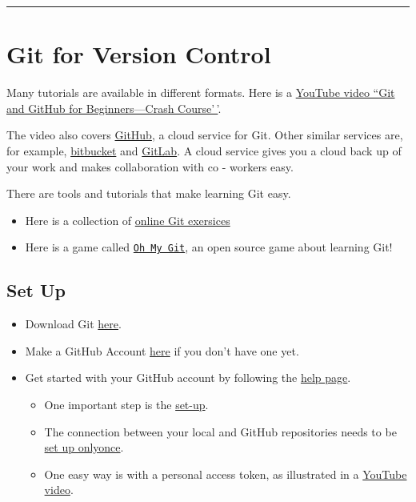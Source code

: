 \documentclass[
]{book}
\theoremstyle{definition}
\theoremstyle{definition}
\theoremstyle{definition}
\theoremstyle{definition}
\theoremstyle{remark}
\begin{document}
\begin{center}\rule{0.5\linewidth}{0.5pt}\end{center}

\section{Git for Version Control}\label{git-for-version-control}

Many tutorials are available in different formats. Here is a \href{https://www.youtube.com/watch?v=USjZcfj8yxE}{YouTube video
``Git and GitHub for Beginners---Crash
Course'\,'}.

The video also covers \href{https://github.com}{GitHub}, a cloud service for Git. Other similar services
are, for example, \href{https://bitbucket.org}{bitbucket} and \href{https://gitlab.com}{GitLab}. A cloud
service gives you a cloud back up of your work and makes collaboration with
co - workers easy.

There are tools and tutorials that make learning Git easy.

\begin{itemize}
\item
  Here is a collection of \href{https://gitexercises.fracz.com}{online Git exersices}
\item
  Here is a game called \href{https://ohmygit.org}{\texttt{Oh\ My\ Git}}, an open
  source game about learning Git!
\end{itemize}

\subsection{Set Up}\label{set-up}

\begin{itemize}
\item
  Download Git \href{https://git-scm.com/downloads}{here}.
\item
  Make a GitHub Account \href{https://www.github.com}{here} if you don't have one yet.
\item
  Get started with your GitHub account by following the \href{https://docs.github.com/en/get-started/onboarding/getting-started-with-your-github-account}{help
  page}.

  \begin{itemize}
  \item
    One important step is the
    \href{https://docs.github.com/en/get-started/onboarding/getting-started-with-your-github-account\#2-setting-up-git}{set-up}.
  \item
    The connection between your local and GitHub repositories needs
    to be \href{https://docs.github.com/en/get-started/getting-started-with-git/about-remote-repositories}{set up onlyonce}.
  \item
    One easy way is with a personal access token, as illustrated
    in a \href{https://www.youtube.com/watch?v=kHkQnuYzwoo}{YouTube video}.
  \end{itemize}
\end{itemize}
\end{document}
